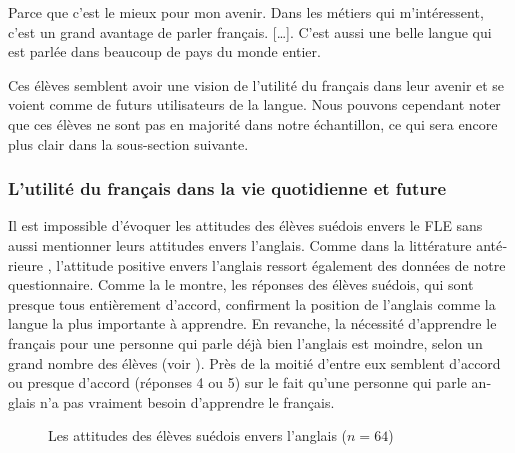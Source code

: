 \documentclass[french, output=paper]{langscibook}
\begin{document}
\begin{otherlanguage}{french}
\ea%
    \label{ex:granfeldt:6}
    Parce que c’est le mieux pour mon avenir. Dans les métiers qui m’intéressent, c’est un grand avantage de parler français. {[…]}. C’est aussi une belle langue qui est parlée dans beaucoup de pays du monde entier. 
\z

Ces élèves semblent avoir une vision de l’utilité du français dans leur avenir et se voient comme de futurs utilisateurs de la langue. Nous pouvons cependant noter que ces élèves ne sont pas en majorité dans notre échantillon, ce qui sera encore plus clair dans la sous-section suivante.

\subsubsection{L’utilité du français dans la vie quotidienne et future}

Il est impossible d’évoquer les attitudes des élèves suédois envers le FLE sans aussi mentionner leurs attitudes envers l’anglais. Comme dans la littérature antérieure \citep{Busse2017}, l’attitude positive envers l’anglais ressort également des données de notre questionnaire. Comme la  le montre, les réponses des élèves suédois, qui sont presque tous entièrement d’accord, confirment la position de l’anglais comme la langue la plus importante à apprendre. En revanche, la nécessité d’apprendre le français pour une personne qui parle déjà bien l’anglais est moindre, selon un grand nombre des élèves (voir ). Près de la moitié d’entre eux semblent d’accord ou presque d’accord (réponses 4 ou 5) sur le fait qu’une personne qui parle anglais n’a pas vraiment besoin d’apprendre le français.

\begin{figure}
\caption{\label{fig:granfeldt:5}Les attitudes des élèves suédois envers l’anglais ($n=64$)}
\end{figure}
  

\end{otherlanguage}
\end{document}
